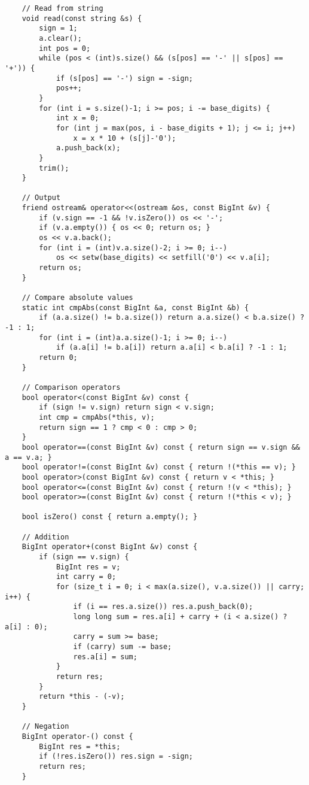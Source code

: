 \documentclass[11pt,a4paper]{article}
\begin{document}
\begin{multicols*}{2}
\begin{lstlisting}
    // Read from string
    void read(const string &s) {
        sign = 1;
        a.clear();
        int pos = 0;
        while (pos < (int)s.size() && (s[pos] == '-' || s[pos] == '+')) {
            if (s[pos] == '-') sign = -sign;
            pos++;
        }
        for (int i = s.size()-1; i >= pos; i -= base_digits) {
            int x = 0;
            for (int j = max(pos, i - base_digits + 1); j <= i; j++)
                x = x * 10 + (s[j]-'0');
            a.push_back(x);
        }
        trim();
    }

    // Output
    friend ostream& operator<<(ostream &os, const BigInt &v) {
        if (v.sign == -1 && !v.isZero()) os << '-';
        if (v.a.empty()) { os << 0; return os; }
        os << v.a.back();
        for (int i = (int)v.a.size()-2; i >= 0; i--)
            os << setw(base_digits) << setfill('0') << v.a[i];
        return os;
    }

    // Compare absolute values
    static int cmpAbs(const BigInt &a, const BigInt &b) {
        if (a.a.size() != b.a.size()) return a.a.size() < b.a.size() ? -1 : 1;
        for (int i = (int)a.a.size()-1; i >= 0; i--)
            if (a.a[i] != b.a[i]) return a.a[i] < b.a[i] ? -1 : 1;
        return 0;
    }

    // Comparison operators
    bool operator<(const BigInt &v) const {
        if (sign != v.sign) return sign < v.sign;
        int cmp = cmpAbs(*this, v);
        return sign == 1 ? cmp < 0 : cmp > 0;
    }
    bool operator==(const BigInt &v) const { return sign == v.sign && a == v.a; }
    bool operator!=(const BigInt &v) const { return !(*this == v); }
    bool operator>(const BigInt &v) const { return v < *this; }
    bool operator<=(const BigInt &v) const { return !(v < *this); }
    bool operator>=(const BigInt &v) const { return !(*this < v); }

    bool isZero() const { return a.empty(); }

    // Addition
    BigInt operator+(const BigInt &v) const {
        if (sign == v.sign) {
            BigInt res = v;
            int carry = 0;
            for (size_t i = 0; i < max(a.size(), v.a.size()) || carry; i++) {
                if (i == res.a.size()) res.a.push_back(0);
                long long sum = res.a[i] + carry + (i < a.size() ? a[i] : 0);
                carry = sum >= base;
                if (carry) sum -= base;
                res.a[i] = sum;
            }
            return res;
        }
        return *this - (-v);
    }

    // Negation
    BigInt operator-() const {
        BigInt res = *this;
        if (!res.isZero()) res.sign = -sign;
        return res;
    }


\end{lstlisting}
\end{multicols*}
\end{document}
